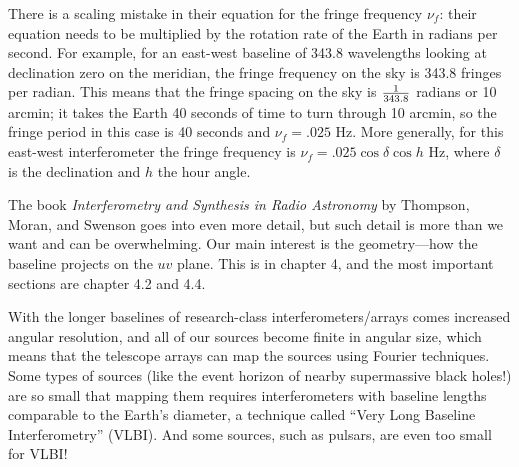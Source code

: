 \documentclass[11pt,preprint]{aastex}
\begin{document}
	There is a scaling mistake in their equation for the fringe
frequency $\nu_f$: their equation needs to be multiplied by the rotation
rate of the Earth in radians per second.  For example, for an east-west
baseline of 343.8 wavelengths looking at declination zero on the
meridian, the fringe frequency on the sky is 343.8 fringes per radian. 
This means that the fringe spacing on the sky is ${1 \over 343.8}$
radians or 10 arcmin; it takes the Earth 40 seconds of time to turn
through 10 arcmin, so the fringe period in this case is 40 seconds and
$\nu_f = .025$ Hz.  More generally, for this east-west interferometer
the fringe frequency is $\nu_f = .025 \cos \delta \cos h$ Hz, where
$\delta$ is the declination and $h$ the hour angle. 

The book {\it Interferometry and Synthesis in
Radio Astronomy} by Thompson, Moran, and Swenson goes into even more detail,
but such detail is
more than we want and can be overwhelming.  Our main interest is the
geometry---how the baseline projects on the $uv$ plane.  This is in
chapter 4, and the most important sections are chapter 4.2 and
4.4. 

With the longer baselines of research-class interferometers/arrays comes
increased angular resolution, and all of our sources become finite in
angular size, which means that the telescope arrays can map the sources
using Fourier techniques. Some types of sources (like the event
horizon of nearby supermassive black holes!) are so small that mapping
them requires interferometers with baseline lengths comparable to the
Earth's diameter, a technique called ``Very Long Baseline
Interferometry'' (VLBI). And some sources, such as pulsars, are even too
small for VLBI!
\end{document}
